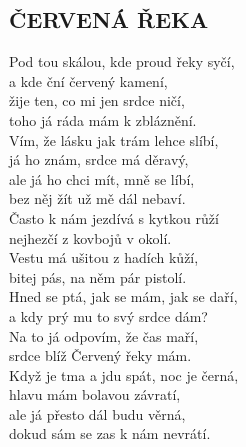 \begin{flushleft}
	\section*{\Huge ČERVENÁ ŘEKA}
\end{flushleft}

Pod tou skálou, kde proud řeky syčí,\\
a kde ční červený kamení,\hspace{0,5cm} \\
žije ten, co mi jen srdce ničí,\\
toho já ráda mám k zbláznění.\\

Vím, že lásku jak trám lehce slíbí,\\
já ho znám, srdce má děravý,\\
ale já ho chci mít, mně se líbí,\\
bez něj žít už mě dál nebaví.\\

Často k nám jezdívá s kytkou růží\\
nejhezčí z kovbojů v okolí.\\
Vestu má ušitou z hadích kůží,\\
bitej pás, na něm pár pistolí.\\

Hned se ptá, jak se mám, jak se daří,\\
a kdy prý mu to svý srdce dám?\\
Na to já odpovím, že čas maří,\\
srdce blíž Červený řeky mám.\\

Když je tma a jdu spát, noc je černá,\\
hlavu mám bolavou závratí,\\
ale já přesto dál budu věrná,\\
dokud sám se zas k nám nevrátí.

\newpage
